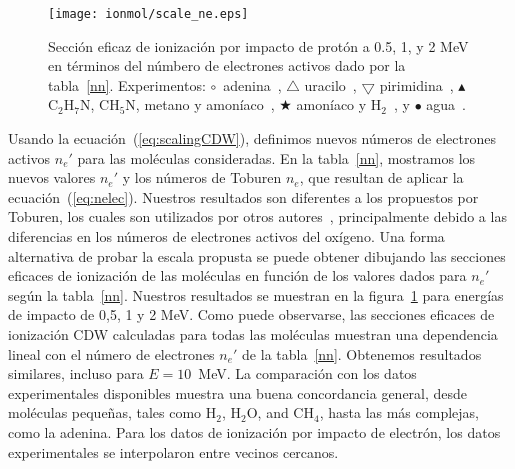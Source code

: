 \begin{figure}
\centering
\texttt{[image: ionmol/scale\_ne.eps]}
\caption[Sección eficaz de ionización por impacto de protón en términos de
$n_e$.]
{Sección eficaz de ionización por impacto de protón a 0.5, 1,
y 2 MeV en términos del númbero de electrones activos dado por la 
tabla~\ref{nn}. Experimentos: 
\mbox{\Large$\circ$}~adenina~\cite{iriki2011}, 
$\triangle$ uracilo~\cite{itoh2013}, 
$\bigtriangledown$ pirimidina~\cite{wolff2014}, 
$\blacktriangle$ C$_2$H$_7$N, CH$_5$N, metano y amoníaco~\cite{lynch1976},
\mbox{\scriptsize$\bigstar$} amoníaco y H$_2$~\cite{rudd1985}, y 
\mbox{\Large$\bullet$} agua~\cite{luna2007}.}
\label{fig:recta}
\end{figure}

Usando la ecuación~(\ref{eq:scalingCDW}), definimos nuevos números de 
electrones activos $n_e'$ para las moléculas consideradas. En la 
tabla~\ref{nn}, mostramos los nuevos valores $n_e'$ y los números de 
Toburen $n_e$, que resultan de aplicar la ecuación~(\ref{eq:nelec}). 
Nuestros resultados son diferentes a los propuestos por Toburen, los 
cuales son utilizados por otros autores~\cite{itoh2013}, principalmente 
debido a las diferencias en los números de electrones activos del 
oxígeno. Una forma alternativa de probar la escala propusta se puede
obtener dibujando las secciones eficaces de ionización de las moléculas 
en función de los valores dados para $n_e'$ según la tabla~\ref{nn}. 
Nuestros resultados se muestran en la figura~\ref{fig:recta} para 
energías de impacto de 0,5, 1 y 2 MeV. Como puede observarse, las 
secciones eficaces de ionización CDW calculadas para todas las moléculas 
muestran una dependencia lineal con el número de electrones $n_e'$ de 
la tabla~\ref{nn}. Obtenemos resultados similares, incluso para 
$E=10$~MeV. La comparación con los datos experimentales disponibles 
muestra una buena concordancia general, desde moléculas pequeñas, tales
como H$_2$, H$_2$O, and CH$_4$, hasta las más complejas, como la adenina. 
Para los datos de ionización por impacto de electrón, los datos 
experimentales se interpolaron entre vecinos cercanos. 


